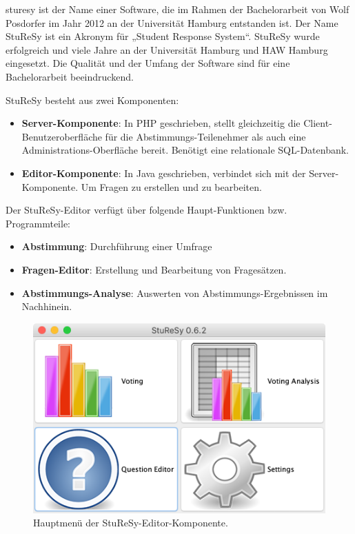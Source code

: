 \ac{sturesy} ist der Name einer Software, die im Rahmen der Bachelorarbeit von Wolf Posdorfer im Jahr 2012 an der Universität Hamburg entstanden ist. Der Name StuReSy ist ein Akronym für „Student Response System“. StuReSy wurde erfolgreich und viele Jahre an der Universität Hamburg und HAW Hamburg eingesetzt. Die Qualität und der Umfang der Software sind für eine Bachelorarbeit beeindruckend.

StuReSy besteht aus zwei Komponenten:
\begin{itemize}
    \item \textbf{Server-Komponente}: In PHP geschrieben, stellt gleichzeitig die Client-Benutzeroberfläche für die Abstimmungs-Teilenehmer als auch eine Administrations-Oberfläche bereit. Benötigt eine relationale SQL-Datenbank.
    \item \textbf{Editor-Komponente}: In Java geschrieben, verbindet sich mit der Server-Komponente. Um Fragen zu erstellen und zu bearbeiten.
\end{itemize}

Der StuReSy-Editor verfügt über folgende Haupt-Funktionen bzw. Programmteile:
\begin{itemize}
    \item \textbf{Abstimmung}: Durchführung einer Umfrage
    \item \textbf{Fragen-Editor}: Erstellung und Bearbeitung von Fragesätzen.
    \item \textbf{Abstimmungs-Analyse}: Auswerten von Abstimmungs-Ergebnissen im Nachhinein.
\end{itemize}

\begin{figure}[H]
    \includegraphics[width=14cm]{chapter/bewertung/bilder/StuReSy_Hauptmenue.png}
    \centering
    \caption{Hauptmenü der StuReSy-Editor-Komponente.}
    \label{Abbildung 2.1}
\end{figure}



